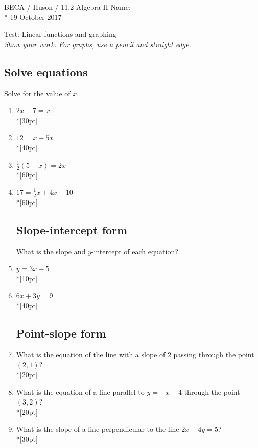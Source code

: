 \documentclass[]{book}
\begin{document}
\noindent BECA / Huson / 11.2 Algebra II \hspace{2in} Name:\\*
19 October 2017
\begin{center}
{\Large Test: Linear functions and graphing}\\
\textit{Show your work. For graphs, use a pencil and straight edge.}
\end{center}



\subsection*{Solve equations}

Solve for the value of $x$.

\begin{enumerate}

\item   $2x-7=x$\\*[30pt]
\item   $12=x-5x$\\*[40pt]
\item   $\frac{1}{2}(5-x)=2x$\\*[60pt]
\item   $17=\frac{1}{2}x+4x-10$\\*[60pt]

\subsection*{Slope-intercept form}

What is the slope and $y$-intercept of each equation? 
\item   $y=3x-5$\\*[10pt]
\item   $6x+3y=9$\\*[40pt]


\subsection*{Point-slope form}

\item What is the equation of the line with a slope of 2 passing through the point $(2,1)$?\\*[20pt]
\item What is the equation of a line parallel to $y=-x+4$ through the point $(3, 2)$?\\*[20pt]
\item What is the slope of a line perpendicular to the line $2x-4y=5$?\\*[30pt]


\end{enumerate}
\end{document}
